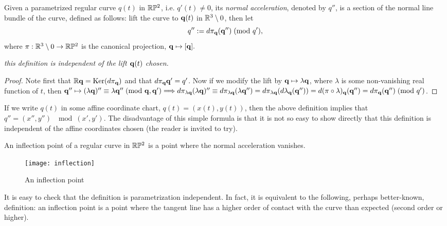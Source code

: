 \begin{definition}Given a parametrized regular curve $q(t)$ in $\mathbb{R}\mathbb{P}^2$, i.e. $q'(t)\neq 0$, 
its {\em normal acceleration}, denoted by  $q''$, is  a section  of the normal line bundle of the curve, defined as follows:  
lift the curve to $\mathbf q(t)$ in $\mathbb{R}^3\setminus 0$, then  let 
$$q'':=  d\pi_{\mathbf q}(\mathbf q'')\;(\hbox{mod } q'), $$ where $\pi:\mathbb{R}^3\setminus 0\to \mathbb{R}\mathbb{P}^2$ is the canonical projection, $\mathbf q\mapsto [\mathbf q].$ 
\end{definition}


 {\em  this definition is independent  of the lift $\mathbf q(t)$ chosen.} 

\begin{proof} Note first  that $\mathbb{R}\mathbf q={\rm Ker}(  d\pi_\mathbf q)$ and that $  d\pi_\mathbf q\mathbf q'=q'$. Now if  we modify the lift by $\mathbf q\mapsto \lambda\mathbf q$, where $\lambda$ is some non-vanishing real function of $t$, 
then $\mathbf q''\mapsto (\lambda\mathbf q)''\equiv\lambda\mathbf q''\;(\hbox{mod } \mathbf q, \mathbf q')\Longrightarrow  d\pi_{\lambda\mathbf q}(\lambda\mathbf q)''
\equiv  d\pi_{ \lambda\mathbf q}(\lambda\mathbf q'')=
  d\pi_{\lambda\mathbf q}(d\lambda_\mathbf q(\mathbf q''))=
d(\pi\circ\lambda)_{\mathbf q}(\mathbf q'')=
d\pi _\mathbf q(\mathbf q'')\;(\hbox{mod } q')$. \end{proof}

\begin{rmrk}  If we write $q(t)$ in some affine coordinate chart, $q(t)=(x(t), y(t))$, then    the above definition implies that $q''=(x'', y'')\; \mod (x',y')$. The disadvantage of this simple formula is that it is not so easy to show directly that this definition is independent of the affine coordinates chosen (the reader is invited to try). 
\end{rmrk}

\begin{definition}\label{def:inflect} An inflection point of a regular curve in $\mathbb{R}\mathbb{P}^2$ is a point where the normal acceleration vanishes. 
\end{definition}
%
\begin{figure}[H]\centering
\texttt{[image: inflection]}
\caption{An inflection point}
\end{figure}
%
\begin{rmrk} It is easy to check that the definition is parametrization independent. In fact, it is equivalent to the following, perhaps better-known, definition:  an inflection point   is a point where the tangent line has a higher order of contact  with the curve than expected  (second order or higher).  
 \end{rmrk}


